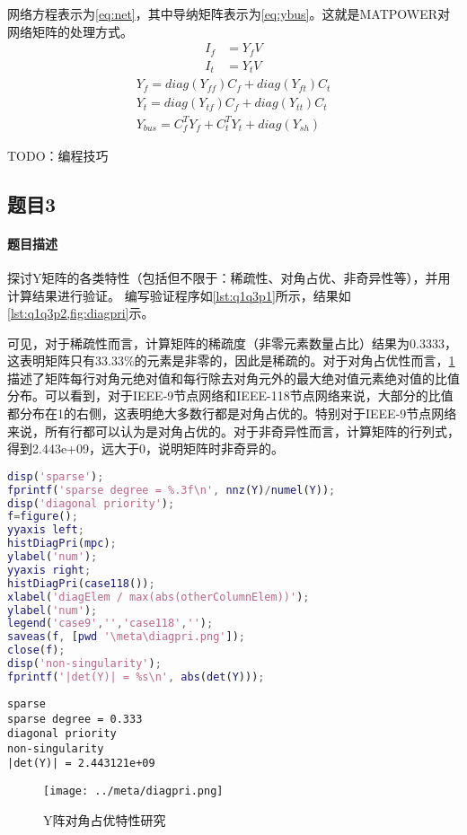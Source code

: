 \documentclass[a4paper,12pt]{article}
\begin{document}
    网络方程表示为\cref{eq:net}，其中导纳矩阵表示为\cref{eq:ybus}。这就是MATPOWER对网络矩阵的处理方式。
    \begin{equation}
      \label{eq:net}
      \begin{aligned}
        I_f &= Y_f V \\
        I_t &= Y_t V
      \end{aligned}
    \end{equation}
    \begin{equation}
      \label{eq:ybus}
      \begin{aligned}
          Y_f = diag(Y_{ff})C_f+diag(Y_{ft})C_t\\
          Y_t = diag(Y_{tf})C_f+diag(Y_{tt})C_t\\
          Y_{bus} = C_f^TY_f+C_t^TY_t+diag(Y_{sh})
      \end{aligned}
    \end{equation}

    TODO：编程技巧
    \subsection{题目3}
    \paragraph{题目描述} 探讨Y矩阵的各类特性（包括但不限于：稀疏性、对角占优、非奇异性等），并用计算结果进行验证。
    编写验证程序如\cref{lst:q1q3p1}所示，结果如\cref{lst:q1q3p2,fig:diagpri}示。

    可见，对于稀疏性而言，计算矩阵的稀疏度（非零元素数量占比）结果为0.3333，这表明矩阵只有33.33\%的元素是非零的，因此是稀疏的。对于对角占优性而言，\cref{fig:diagpri}描述了矩阵每行对角元绝对值和每行除去对角元外的最大绝对值元素绝对值的比值分布。可以看到，对于IEEE-9节点网络和IEEE-118节点网络来说，大部分的比值都分布在1的右侧，这表明绝大多数行都是对角占优的。特别对于IEEE-9节点网络来说，所有行都可以认为是对角占优的。对于非奇异性而言，计算矩阵的行列式，得到2.443e+09，远大于0，说明矩阵时非奇异的。

    \begin{lstlisting}[language=matlab,label=lst:q1q3p1,caption={矩阵特性验证程序}]
%% feature of Y
disp('sparse');
fprintf('sparse degree = %.3f\n', nnz(Y)/numel(Y));
disp('diagonal priority');
f=figure();
yyaxis left;
histDiagPri(mpc);
ylabel('num');
yyaxis right;
histDiagPri(case118());
xlabel('diagElem / max(abs(otherColumnElem))');
ylabel('num');
legend('case9','','case118','');
saveas(f, [pwd '\meta\diagpri.png']);
close(f);
disp('non-singularity');
fprintf('|det(Y)| = %s\n', abs(det(Y)));
    \end{lstlisting}
    \begin{lstlisting}[label=lst:q1q3p2,caption={矩阵特性验证结果}]
sparse
sparse degree = 0.333
diagonal priority
non-singularity
|det(Y)| = 2.443121e+09
    \end{lstlisting}
    \begin{figure}
      \texttt{[image: ../meta/diagpri.png]}
      \caption{Y阵对角占优特性研究}
      \label{fig:diagpri}
    \end{figure}
\end{document}
